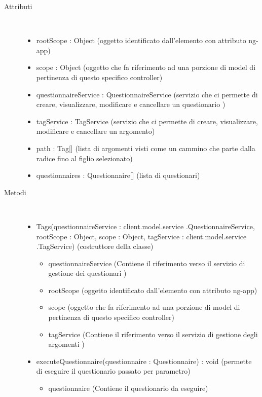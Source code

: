 \begin{description}
\item[Attributi] \hfill \\
 \vspace{-7mm}
\begin{itemize}
\item rootScope : Object (oggetto identificato dall’elemento con attributo ng-app)
\item scope : Object (oggetto che fa riferimento ad una porzione di model di pertinenza di questo specifico controller)
\item questionnaireService : QuestionnaireService (servizio che ci permette di creare, visualizzare, modificare e cancellare un questionario )
\item tagService : TagService (servizio che ci permette di creare, visualizzare, modificare e cancellare un argomento)
\item path : Tag[] (lista di argomenti visti come un cammino che parte dalla radice fino al figlio selezionato)
\item questionnaires  : Questionnaire[] (lista di questionari)
\end{itemize}

\item[Metodi] \hfill \\
 \vspace{-7mm}
\begin{itemize}
\item Tags(questionnaireService : client.model.service .QuestionnaireService, rootScope : Object, scope : Object, tagService : client.model.service .TagService) (costruttore della classe)\begin{itemize}
\item questionnaireService (Contiene il riferimento verso il servizio di gestione dei questionari )
\item rootScope (oggetto identificato dall’elemento con attributo ng-app)
\item scope (oggetto che fa riferimento ad una porzione di model di pertinenza di questo specifico controller)
\item tagService (Contiene il riferimento verso il servizio di gestione degli argomenti )
\end{itemize}

\item executeQuestionnaire(questionnaire : Questionnaire) : void (permette di eseguire il questionario passato per parametro)\begin{itemize}
\item questionnaire (Contiene il questionario da eseguire)
\end{itemize}


\end{itemize}
\end{description}
